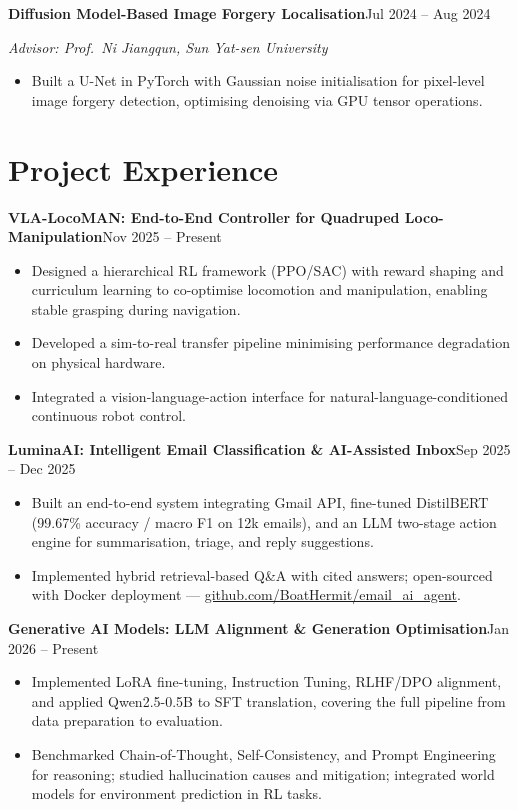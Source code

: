 \documentclass[a4paper,10pt]{article}
\newcommand{\entry}[2]{%
  \noindent\textbf{#1}\hfill#2\par%
}
\newcommand{\subline}[1]{%
  \noindent\textit{#1}\par%
}
\begin{document}
\vspace{3pt}
\entry{Diffusion Model-Based Image Forgery Localisation}{Jul 2024 -- Aug 2024}
\subline{Advisor: Prof.\ Ni Jiangqun, Sun Yat-sen University}
\begin{itemize}
  \item Built a U-Net in PyTorch with Gaussian noise initialisation for pixel-level image forgery detection, optimising denoising via GPU tensor operations.
\end{itemize}

\section*{Project Experience}

\entry{VLA-LocoMAN: End-to-End Controller for Quadruped Loco-Manipulation}{Nov 2025 -- Present}
\begin{itemize}
  \item Designed a hierarchical RL framework (PPO/SAC) with reward shaping and curriculum learning to co-optimise locomotion and manipulation, enabling stable grasping during navigation.
  \item Developed a sim-to-real transfer pipeline minimising performance degradation on physical hardware.
  \item Integrated a vision-language-action interface for natural-language-conditioned continuous robot control.
\end{itemize}

\vspace{3pt}
\entry{LuminaAI: Intelligent Email Classification \& AI-Assisted Inbox}{Sep 2025 -- Dec 2025}
\begin{itemize}
  \item Built an end-to-end system integrating Gmail API, fine-tuned DistilBERT (99.67\% accuracy / macro F1 on 12k emails), and an LLM two-stage action engine for summarisation, triage, and reply suggestions.
  \item Implemented hybrid retrieval-based Q\&A with cited answers; open-sourced with Docker deployment --- \href{https://github.com/BoatHermit/email_ai_agent}{github.com/BoatHermit/email\_ai\_agent}.
\end{itemize}

\vspace{3pt}
\entry{Generative AI Models: LLM Alignment \& Generation Optimisation}{Jan 2026 -- Present}
\begin{itemize}
  \item Implemented LoRA fine-tuning, Instruction Tuning, RLHF/DPO alignment, and applied Qwen2.5-0.5B to SFT translation, covering the full pipeline from data preparation to evaluation.
  \item Benchmarked Chain-of-Thought, Self-Consistency, and Prompt Engineering for reasoning; studied hallucination causes and mitigation; integrated world models for environment prediction in RL tasks.
\end{itemize}
\end{document}
